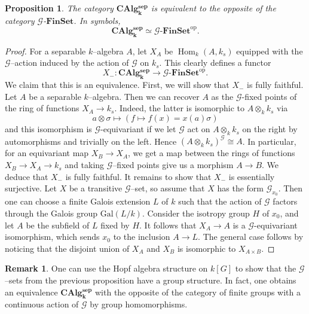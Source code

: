 \documentclass{article}
\theoremstyle{plain}
\newtheorem{Prop}[Th]{Proposition}
\theoremstyle{definition}
\newtheorem{Rem}[Th]{Remark}
\DeclareMathOperator{\Hom}{Hom}
\begin{document}
\begin{Prop} 
The category $\mathbf{CAlg_k^\textrm{sep}}$ is equivalent to the opposite of the category $\mathcal{G}$-$\mathbf{FinSet}$. In symbols, 
\[
  \mathbf{CAlg_k^\textrm{sep}} \simeq \mathcal{G}\textrm{-}\mathbf{FinSet}^\textrm{op}.
\]
\end{Prop}

\begin{proof} For a separable $k$--algebra $A$, let $X_A$ be $\Hom_k(A,k_s)$ equipped with the $\mathcal{G}$--action induced by the action of $\mathcal{G}$ on $k_s$. This clearly defines a functor 
\[
X_{-}\colon\mathbf{CAlg_k^\textrm{sep}} \to \mathcal{G} \textrm{-}\mathbf{FinSet}^\textrm{op}.
\]
We claim that this is an equivalence. First, we will show that $X_{-}$ is fully faithful. Let $A$ be a separable $k$--algebra. Then we can recover $A$ as the $\mathcal{G}$-fixed points of the ring of functions $X_A\to k_s$. Indeed, the latter is isomorphic to $A\otimes_k k_s$ via 
\[
a\otimes \sigma \mapsto (f\mapsto f(x)=x(a)\sigma)
\]
and this isomorphism is $\mathcal{G}$-equivariant if we let $\mathcal{G}$ act on $A\otimes_k k_s$ on the right by automorphisms and trivially on the left. Hence $(A\otimes_k k_s)^\mathcal{G}\cong A$. In particular, for an equivariant map $X_B\to X_A$, we get a map between the rings of functions $X_B\to X_A\to k_s$ and taking $\mathcal{G}$--fixed points give us a morphism $A\to B$. We deduce that $X_{-}$ is fully faithful. 
It remains to show that $X_{-}$ is essentially surjective. Let $X$ be a transitive $\mathcal{G}$--set, so assume that $X$ has the form $\mathcal{G}_{x_0}$. Then one can choose a finite Galois extension $L$ of $k$ such that the action of $\mathcal{G}$ factors through the Galois group $\mathrm{Gal}(L/k)$. Consider the isotropy group $H$ of $x_0$, and let $A$ be the subfield of $L$ fixed by $H$. It follows that $X_A\to A$ is a $\mathcal{G}$-equivariant isomorphism, which sends $x_0$ to the inclusion $A\to L$. The general case follows by noticing that the disjoint union of $X_A$ and $X_B$ is isomorphic to $X_{A\times B}$. 
\end{proof}

\begin{Rem}
    One can use the Hopf algebra structure on $k[G]$ to show that the $\mathcal{G}$--sets from the previous proposition have a group structure. In fact, one obtains an equivalence  $\mathbf{CAlg_k^\textrm{sep}}$ with the opposite of the category of finite groups with a continuous action of $\mathcal{G}$ by group homomorphisms.
\end{Rem}
\end{document}
